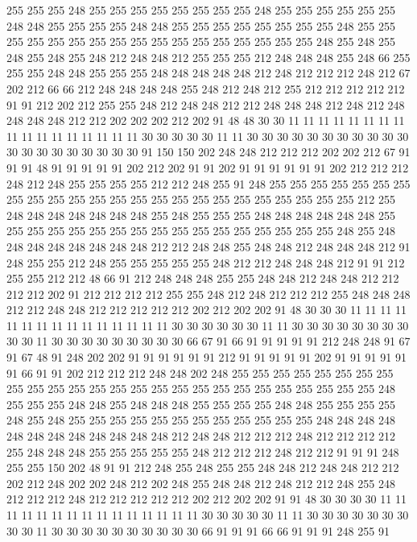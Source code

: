 255 255 255 248 255 255 255 255 255 255 255 255 248 255 255 255 255 255 255 248
248 255 255 255 255 248 248 255 255 255 255 255 255 255 255 248 255 255 255 255
255 255 255 255 255 255 255 255 255 255 255 255 255 248 255 248 255 248 255 248
255 248 212 248 248 212 255 255 255 212 248 248 248 255 248 66 255 255 255 248
248 255 255 255 248 248 248 248 248 212 248 212 212 212 248 212 67 202 212 66
66 212 248 248 248 248 255 248 212 248 212 255 212 212 212 212 212 91 91 212
202 212 255 255 248 212 248 248 212 212 248 248 248 212 248 212 248 248 248 248
212 212 202 202 202 212 202 91 48 48 30 30 11 11 11 11 11 11 11 11
11 11 11 11 11 11 11 11 11 30 30 30 30 30 11 11 30 30 30 30
30 30 30 30 30 30 30 30 30 30 30 30 30 30 30 30 91 150 150 202
248 248 212 212 212 202 202 212 67 91 91 91 48 91 91 91 91 91 202 212
202 91 91 202 91 91 91 91 91 91 202 212 212 212 248 212 248 255 255 255
255 212 212 248 255 91 248 255 255 255 255 255 255 255 255 255 255 255 255 255
255 255 255 255 255 255 255 255 255 255 255 212 255 248 248 248 248 248 248 248
255 248 255 255 255 248 248 248 248 248 248 255 255 255 255 255 255 255 255 255
255 255 255 255 255 255 255 255 248 255 248 248 248 248 248 248 248 248 212 212
248 248 255 248 248 212 248 248 248 212 91 248 255 255 212 248 255 255 255 255
255 248 212 212 248 248 248 212 91 91 212 255 255 212 212 48 66 91 212 248
248 248 255 255 248 248 212 248 248 212 212 212 212 202 91 212 212 212 212 255
255 248 212 248 212 212 212 255 248 248 248 212 212 248 248 212 212 212 212 212
202 212 202 202 91 48 30 30 30 11 11 11 11 11 11 11 11 11 11 11
11 11 11 11 30 30 30 30 30 30 11 11 30 30 30 30 30 30 30 30
30 30 11 30 30 30 30 30 30 30 30 30 66 67 91 66 91 91 91 91
91 212 248 248 91 67 91 67 48 91 248 202 202 91 91 91 91 91 91 212
91 91 91 91 91 202 91 91 91 91 91 91 66 91 91 202 212 212 212 248
248 202 248 255 255 255 255 255 255 255 255 255 255 255 255 255 255 255 255 255
255 255 255 255 255 255 255 255 255 248 255 255 255 248 248 255 248 248 248 255
255 255 255 248 248 255 255 255 255 248 255 248 255 255 255 255 255 255 255 255
255 255 255 255 248 248 248 248 248 248 248 248 248 248 248 248 212 248 248 212
212 212 248 212 212 212 212 255 248 248 248 255 255 255 255 255 248 212 212 212
248 212 212 91 91 91 248 255 255 150 202 48 91 91 212 248 255 248 255 255
248 248 212 248 248 212 212 202 212 248 202 202 248 212 202 248 255 248 248 212
248 212 212 248 255 248 212 212 212 248 212 212 212 212 212 202 212 202 202 91
91 48 30 30 30 30 11 11 11 11 11 11 11 11 11 11 11 11 11 11
11 30 30 30 30 30 11 11 30 30 30 30 30 30 30 30 30 11 30 30
30 30 30 30 30 30 30 30 66 91 91 91 66 66 91 91 91 248 255 91
